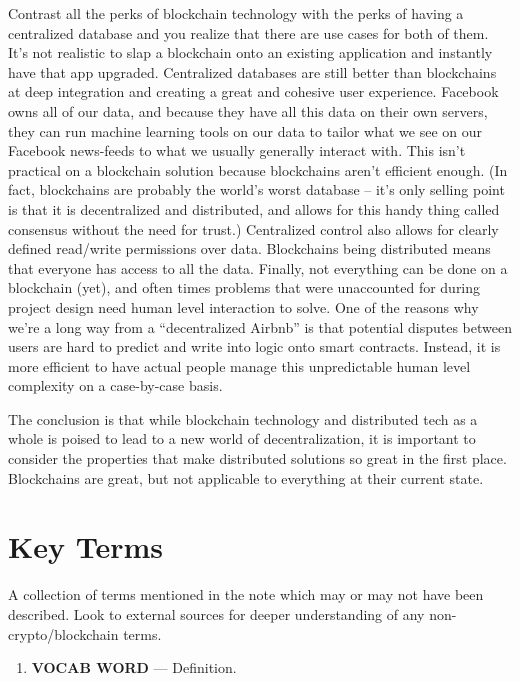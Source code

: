 \documentclass[full.tex]{subfiles}
\begin{document}
    Contrast all the perks of blockchain technology with the perks of having a centralized database and you realize that there are use cases for both of them. It's not realistic to slap a blockchain onto an existing application and instantly have that app upgraded. Centralized databases are still better than blockchains at deep integration and creating a great and cohesive user experience. Facebook owns all of our data, and because they have all this data on their own servers, they can run machine learning tools on our data to tailor what we see on our Facebook news-feeds to what we usually generally interact with. This isn't practical on a blockchain solution because blockchains aren't efficient enough. (In fact, blockchains are probably the world's worst database -- it's only selling point is that it is decentralized and distributed, and allows for this handy thing called consensus without the need for trust.) Centralized control also allows for clearly defined read/write permissions over data. Blockchains being distributed means that everyone has access to all the data. Finally, not everything can be done on a blockchain (yet), and often times problems that were unaccounted for during project design need human level interaction to solve. One of the reasons why we're a long way from a ``decentralized Airbnb'' is that potential disputes between users are hard to predict and write into logic onto smart contracts. Instead, it is more efficient to have actual people manage this unpredictable human level complexity on a case-by-case basis.
    
    The conclusion is that while blockchain technology and distributed tech as a whole is poised to lead to a new world of decentralization, it is important to consider the properties that make distributed solutions so great in the first place. Blockchains are great, but not applicable to everything at their current state. 
    
 
    
    \newpage
    \thispagestyle{firstpage}
    \vspace*{2\baselineskip}
    \section*{Key Terms}
    \noindent A collection of terms mentioned in the note which may or may not have been described. Look to external sources for deeper understanding of any non-crypto/blockchain terms.
    \begin{enumerate}
        \item \textbf{VOCAB WORD} --- Definition. %
    \end{enumerate}
\end{document}
